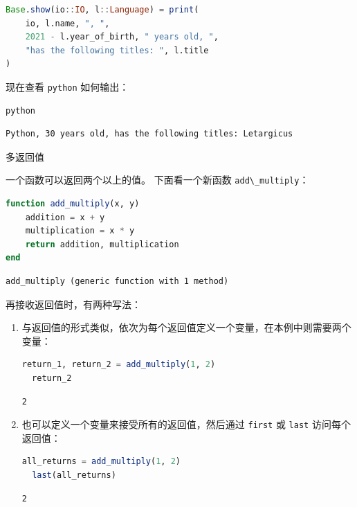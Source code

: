 \documentclass[
  notoc %
]{tufte-book}
\makeatletter
\newcommand{\passthrough}[1]{#1}
\renewcommand\subsubsection{%
\@startsection{subsubsection}{3}{\z@ }{-3.25ex\@plus -1ex \@minus -.2ex}{1.5ex \@plus .2ex}{\normalfont \normalsize \bfseries }
}
\makeatother
\begin{document}
\begin{lstlisting}[language=Julia]
Base.show(io::IO, l::Language) = print(
    io, l.name, ", ",
    2021 - l.year_of_birth, " years old, ",
    "has the following titles: ", l.title
)
\end{lstlisting}

现在查看 \passthrough{\lstinline!python!} 如何输出：

\begin{lstlisting}[language=Julia]
python
\end{lstlisting}

\begin{lstlisting}[language=Output]
Python, 30 years old, has the following titles: Letargicus
\end{lstlisting}

\hypertarget{sec:function_multiple}{%
\subsubsection{多返回值}\label{sec:function_multiple}}

一个函数可以返回两个以上的值。 下面看一个新函数
\passthrough{\lstinline!add\_multiply!}：

\begin{lstlisting}[language=Julia]
function add_multiply(x, y)
    addition = x + y
    multiplication = x * y
    return addition, multiplication
end
\end{lstlisting}

\begin{lstlisting}[language=Output]
add_multiply (generic function with 1 method)
\end{lstlisting}

再接收返回值时，有两种写法：

\begin{enumerate}
\def\labelenumi{\arabic{enumi}.}
\item
  与返回值的形式类似，依次为每个返回值定义一个变量，在本例中则需要两个变量：

  \begin{lstlisting}[language=Julia]
  return_1, return_2 = add_multiply(1, 2)
  return_2
  \end{lstlisting}

  \begin{lstlisting}[language=Output]
  2
  \end{lstlisting}
\item
  也可以定义一个变量来接受所有的返回值，然后通过
  \passthrough{\lstinline!first!} 或 \passthrough{\lstinline!last!}
  访问每个返回值：

  \begin{lstlisting}[language=Julia]
  all_returns = add_multiply(1, 2)
  last(all_returns)
  \end{lstlisting}

  \begin{lstlisting}[language=Output]
  2
  \end{lstlisting}
\end{enumerate}
\end{document}
